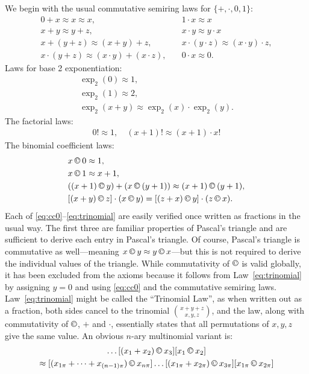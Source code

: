\documentclass[eqnor,reqno]{amsart}
\theoremstyle{plain}
\theoremstyle{definition}
\newcommand{\cc}{\mathbin{\textup{\copyright}}}
\begin{document}
We begin with the usual commutative semiring laws for $\{+,\cdot,0,1\}$:
\begin{align*}
0+x\approx x\approx x,\quad &1\cdot x \approx x\\
x+y\approx y+z, \quad & x\cdot y\approx y\cdot x\\
x+(y+z)\approx (x+y)+z,\quad  & x\cdot (y\cdot z)\approx (x\cdot y)\cdot z, \\
x\cdot (y+z)  \approx  (x\cdot y)+(x\cdot z),\quad & 0\cdot x\approx 0.
\end{align*}
Laws for base 2 exponentiation:
\begin{align}
\exp_2(0)\approx 1,\label{eq:exp0}\\
\exp_2(1)\approx 2,\label{eq:exp1}\\
\exp_2(x+y)\approx \exp_2(x)\cdot \exp_2(y).\label{eq:expplus}
\end{align}
The factorial laws:
\begin{align}
0!\approx 1,\quad (x+1)!\approx  (x+1)\cdot x!\label{eq:factorial}
\end{align}
The binomial coefficient laws:
\begin{align}
&x\cc 0\approx 1,\label{eq:cc0}\\
&x\cc 1\approx x+1,\label{eq:ccplusone}\\
&((x+1)\cc y) + (x\cc (y+1))\approx (x+1)\cc(y+1),\label{eq:pascal}\\
&[(x+y) \cc z] \cdot (x \cc y) = [(z+x)\cc y] \cdot (z \cc x).\label{eq:trinomial}
\end{align}
Each of \eqref{eq:cc0}--\eqref{eq:trinomial} are easily verified once written as fractions in the usual way.  The first three are familiar properties of Pascal's triangle and are sufficient to derive each entry in Pascal's triangle.  Of course, Pascal's triangle is commutative as well---meaning $x\cc y \approx y\cc x$---but this is not required to derive the individual values of the triangle.  While commutativity of $\cc$ is valid globally, it has been excluded from the axioms because it follows from Law~\eqref{eq:trinomial} by assigning $y=0$ and using \eqref{eq:cc0} and the commutative semiring laws.  Law~\eqref{eq:trinomial} might be called the ``Trinomial Law'', as when written out as a fraction, both sides cancel to the trinomial $\binom{x+y+z}{x,y,z}$, and the law, along with commutativity of $\cc$, $+$ and $\cdot$, essentially states that all permutations of $x,y,z$ give the same value.  An obvious $n$-ary multinomial variant is:
\begin{multline*}
[(x_1+\dots+x_{n-1})\cc x_n]\dots [(x_1+x_2)\cc x_3][x_1\cc x_2]\\
\approx [(x_{1\pi}+\dots+x_{(n-1)\pi})\cc x_{n\pi}]\dots [(x_{1\pi}+x_{2\pi})\cc x_{3\pi}][x_{1\pi}\cc x_{2\pi}]
\end{multline*}
\end{document}
